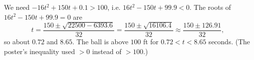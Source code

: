 We need $-16t^2+150t+0.1>100$, i.e. $16t^2-150t+99.9<0$. The roots of $16t^2-150t+99.9=0$ are
\[t=\dfrac{150\pm\sqrt{22500-6393.6}}{32}=\dfrac{150\pm\sqrt{16106.4}}{32}\approx\dfrac{150\pm126.91}{32},\]
so about $0.72$ and $8.65$. The ball is above $100$ ft for $\boxed{0.72<t<8.65}$ seconds. (The poster's inequality used $>0$ instead of $>100$.)
